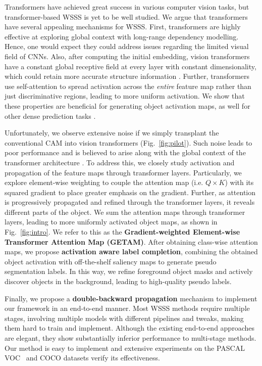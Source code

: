 \documentclass[10pt,twocolumn,letterpaper]{article}
\begin{document}
Transformers \cite{vaswani2017attention} have achieved great success in various computer vision tasks, but transformer-based WSSS is yet to be well studied.
We argue that transformers have several appealing mechanisms for WSSS. 
First, transformers are highly effective at exploring global context with long-range dependency modelling. Hence, one would expect they could address issues regarding the limited visual field of CNNs.
Also, after computing the initial embedding, vision transformers have a constant global receptive field at every layer 
with constant dimensionality, 
which could retain more accurate structure information \cite{ranftl2021vision,mao2021transformer}. Further, transformers use self-attention to spread activation across the \textit{entire} feature map rather than just discriminative regions, leading to more uniform activation.
We show that these properties are beneficial for generating object activation maps, as well for other dense prediction tasks \cite{ranftl2021vision,liu2021swin,bao2021beit,wang2021pvtv2,strudel2021segmenter}. 


Unfortunately, we observe extensive noise if we simply transplant the conventional CAM \cite{zhou2016learning} into vision transformers (Fig.~\ref{fig:pilot}). Such noise leads to poor performance and is
believed
to arise along with the global context of the transformer architecture \cite{zhang2021aggregating}.
To address this, we closely study activation and propagation of the feature maps through transformer layers. Particularly, we explore element-wise weighting to couple the attention map (i.e. $Q \times K$) with its squared gradient
to
place greater emphasis on the gradient. 
Further, as attention is progressively propagated and refined through the transformer layers, it reveals different  parts of the object.
We sum the attention maps through transformer layers, leading to more uniformly activated
object maps, as shown in Fig.~\ref{fig:intro}. We refer to this as the \textbf{Gradient-weighted Element-wise Transformer Attention Map (GETAM)}.
After obtaining class-wise attention maps,
we propose \textbf{activation aware label completion}, combining the obtained object activation with off-the-shelf saliency maps to generate pseudo segmentation labels. 
In this way, we refine foreground object masks and actively discover objects in the background, leading to high-quality pseudo labels.

Finally, we propose a \textbf{double-backward propagation} mechanism to implement our framework in an end-to-end manner. Most WSSS methods require multiple stages, involving multiple models with different pipelines and tweaks, making them hard to train and implement.
Although the existing end-to-end approaches
 \cite{pinheiro2015image,papandreou2015weakly,zeng2019joint,zhang2020reliability,Araslanov_2020_CVPR,zhang2021adaptive} 
 are elegant, they
show substantially inferior performance to multi-stage methods.
Our method is easy to implement and extensive experiments on the PASCAL VOC~\cite{everingham2010pascal}
and COCO \cite{lin2014microsoft} datasets verify its effectiveness.
\end{document}
